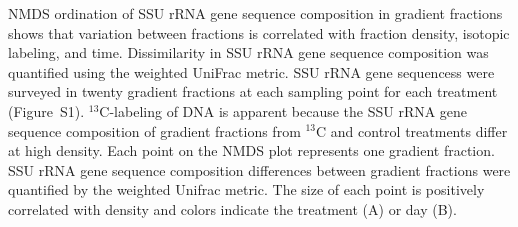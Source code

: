 NMDS ordination of SSU rRNA gene sequence composition in
gradient fractions shows that variation between fractions is
correlated with fraction density, isotopic labeling, and
time. Dissimilarity in SSU rRNA gene sequence composition was quantified using the 
weighted UniFrac metric. SSU rRNA gene sequencess were surveyed in twenty
gradient fractions at each sampling point for each treatment (Figure~S1).
$^{13}$C-labeling of DNA is apparent because the SSU rRNA gene sequence composition of
gradient fractions from $^{13}$C and control treatments differ at high density.
Each point on the NMDS plot represents one gradient fraction.  SSU rRNA gene sequence
composition differences between gradient fractions were quantified by the
weighted Unifrac metric. The size of each point is positively correlated with
density and colors indicate the treatment (A) or day (B).
